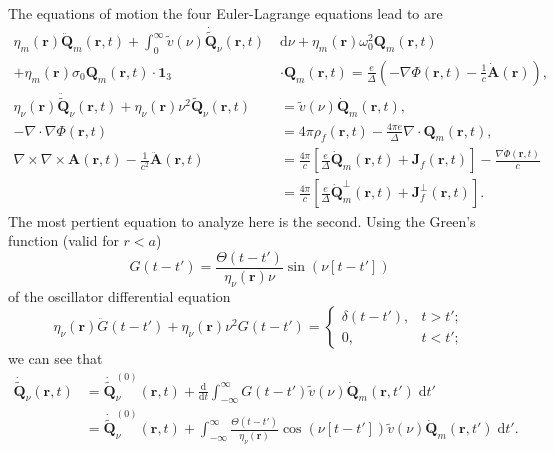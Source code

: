 The equations of motion the four Euler-Lagrange equations lead to are
\begin{equation}\label{eq:fourEOMs}
\begin{split}
\eta_m(\mathbf{r})\ddot{\mathbf{Q}}_m(\mathbf{r},t) + \int_0^\infty\tilde{v}(\nu)\dot{\tilde{\mathbf{Q}}}_\nu(\mathbf{r},t)\;&\mathrm{d}\nu + \eta_m(\mathbf{r})\omega_0^2\mathbf{Q}_m(\mathbf{r},t)\\
+ \eta_m(\mathbf{r})\sigma_0\mathbf{Q}_m(\mathbf{r},t)\cdot\bm{1}_3&\cdot\mathbf{Q}_m(\mathbf{r},t) = \frac{e}{\Delta}\left(-\nabla\Phi(\mathbf{r},t) - \frac{1}{c}\dot{\mathbf{A}}(\mathbf{r})\right),\\[1.0em]
\eta_\nu(\mathbf{r})\ddot{\tilde{\mathbf{Q}}}_\nu(\mathbf{r},t) + \eta_\nu(\mathbf{r})\nu^2\tilde{\mathbf{Q}}_\nu(\mathbf{r},t) &= \tilde{v}(\nu)\dot{\mathbf{Q}}_m(\mathbf{r},t),\\[0.5em]
-\nabla\cdot\nabla\Phi(\mathbf{r},t) &= 4\pi\rho_f(\mathbf{r},t) - \frac{4\pi e}{\Delta}\nabla\cdot\mathbf{Q}_m(\mathbf{r},t),\\
\nabla\times\nabla\times\mathbf{A}(\mathbf{r},t) - \frac{1}{c^2}\ddot{\mathbf{A}}(\mathbf{r},t) &= \frac{4\pi}{c}\left[\frac{e}{\Delta}\dot{\mathbf{Q}}_m(\mathbf{r},t) + \mathbf{J}_f(\mathbf{r},t)\right] - \frac{\nabla\dot{\Phi}(\mathbf{r},t)}{c}\\
&= \frac{4\pi}{c}\left[\frac{e}{\Delta}\dot{\mathbf{Q}}_m^\perp(\mathbf{r},t) + \mathbf{J}_f^\perp(\mathbf{r},t)\right].
\end{split}
\end{equation}
The most pertient equation to analyze here is the second. Using the Green's function (valid for $r < a$)
\begin{equation}
G(t - t') = \frac{\Theta(t - t')}{\eta_\nu(\mathbf{r})\nu}\sin(\nu[t - t'])
\end{equation}
of the oscillator differential equation
\begin{equation}
\eta_\nu(\mathbf{r})\ddot{G}(t - t') + \eta_\nu(\mathbf{r})\nu^2G(t - t') = 
\begin{cases}
\delta(t - t'), & t > t';\\
0, & t < t';
\end{cases}
\end{equation}
we can see that
\begin{equation}
\begin{split}
\dot{\tilde{\mathbf{Q}}}_\nu(\mathbf{r},t) &= \dot{\tilde{\mathbf{Q}}}_\nu^{(0)}(\mathbf{r},t) + \frac{\mathrm{d}}{\mathrm{d}t}\int_{-\infty}^\infty G(t - t')\tilde{v}(\nu)\dot{\mathbf{Q}}_m(\mathbf{r},t')\;\mathrm{d}t'\\
&= \dot{\tilde{\mathbf{Q}}}_\nu^{(0)}(\mathbf{r},t) + \int_{-\infty}^\infty\frac{\Theta(t - t')}{\eta_\nu(\mathbf{r})}\cos(\nu[t - t'])\tilde{v}(\nu)\dot{\mathbf{Q}}_m(\mathbf{r},t')\;\mathrm{d}t'.
\end{split}
\end{equation}
